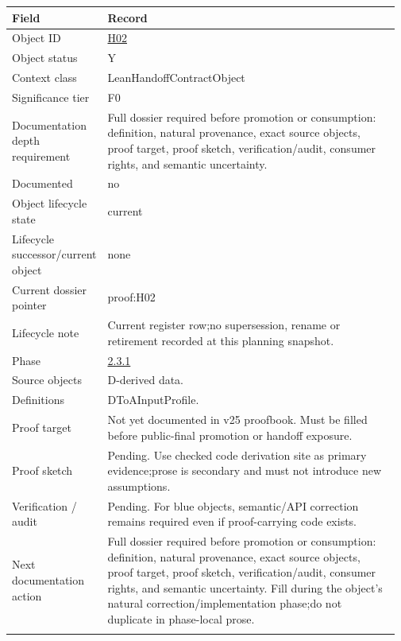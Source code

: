 \begin{longtable}{L{0.16\linewidth} L{0.81\linewidth}}
\hline
\textbf{Field} & \textbf{Record}\\
\hline
Object ID & \hyperlink{object-row-H02}{H02}\\
\hline\addlinespace[0.20em]
Object status & Y\\
\hline\addlinespace[0.20em]
Context class & LeanHandoffContractObject\\
\hline\addlinespace[0.20em]
Significance tier & F0\\
\hline\addlinespace[0.20em]
Documentation depth requirement & Full dossier required before promotion or consumption: definition, natural provenance, exact source objects, proof target, proof sketch, verification/\allowbreak{}audit, consumer rights, and semantic uncertainty.\\
\hline\addlinespace[0.20em]
Documented & no\\
\hline\addlinespace[0.20em]
Object lifecycle state & current\\
\hline\addlinespace[0.20em]
Lifecycle successor/\allowbreak{}current object & none\\
\hline\addlinespace[0.20em]
Current dossier pointer & proof:H02\\
\hline\addlinespace[0.20em]
Lifecycle note & Current register row;\newline no supersession, rename or retirement recorded at this planning snapshot.\\
\hline\addlinespace[0.20em]
Phase & \hyperlink{phase-row-2-3-1}{2.3.1}\\
\hline\addlinespace[0.20em]
Source objects & D-derived data.\\
\hline\addlinespace[0.20em]
Definitions & DToAInputProfile.\\
\hline\addlinespace[0.20em]
Proof target & Not yet documented in v25 proofbook. Must be filled before public-final promotion or handoff exposure.\\
\hline\addlinespace[0.20em]
Proof sketch & Pending. Use checked code derivation site as primary evidence;\newline prose is secondary and must not introduce new assumptions.\\
\hline\addlinespace[0.20em]
Verification /\allowbreak{} audit & Pending. For blue objects, semantic/\allowbreak{}API correction remains required even if proof-carrying code exists.\\
\hline\addlinespace[0.20em]
Next documentation action & Full dossier required before promotion or consumption: definition, natural provenance, exact source objects, proof target, proof sketch, verification/\allowbreak{}audit, consumer rights, and semantic uncertainty. Fill during the object's natural correction/\allowbreak{}implementation phase;\newline do not duplicate in phase-local prose.\\
\hline\addlinespace[0.20em]
\end{longtable}
